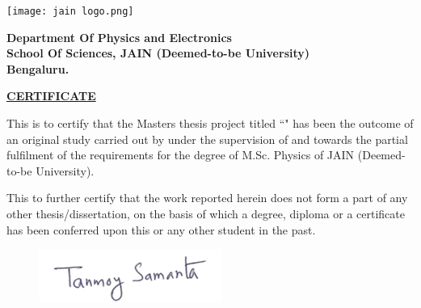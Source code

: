 

\thispagestyle{empty}

\begin{center}

    \texttt{[image: jain logo.png]}

    \large
    \vspace{0.5cm}

    \textbf{Department Of Physics and Electronics\\
        School Of Sciences, JAIN (Deemed-to-be University)\\
        Bengaluru.}

    \vspace{0.5cm}

    \underline{\textbf{CERTIFICATE}}

\end{center}

\normalfont{}
\noindent
This is to certify that the Masters thesis project titled ``\textbf{\projectname}" has been
the outcome of an original study carried out by \textbf{\auth} under the supervision of
\textbf{\gnameOne} and \textbf{\gnameTwo} towards the partial fulfilment of the requirements
for the degree of M.Sc. Physics of JAIN (Deemed-to-be University).

\vspace{0.5cm}

\setlength{\parskip}{0cm}
\noindent
    {
        This to further certify that the work reported herein does not form a part of any other thesis/dissertation, on the basis of which a degree, diploma or a certificate has been conferred upon this or any other student in the past.
    }


    \vspace{1cm}
    \noindent
    \renewcommand{\arraystretch}{0.8}
    \renewcommand\theadfont{\bfseries}


    \begin{figure}[h!]
        \centering
        \includegraphics[scale=0.75, right]{images/tanmoy_sign.png}
    \end{figure}

